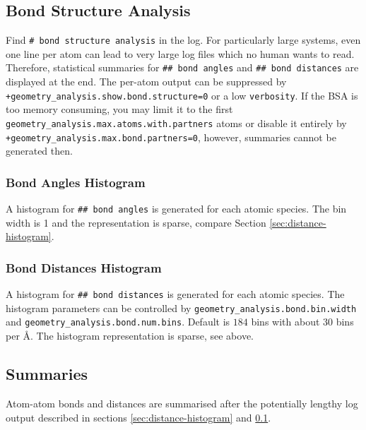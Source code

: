 \documentclass[oribibl]{llncs}
\newcommand{\ttt}[1]{\texttt{#1}}
\begin{document}
\subsection{Bond Structure Analysis} \label{sec:bond-structure-analysis}
%
Find \ttt{\# bond structure analysis} in the log.
For particularly large systems, even one line per atom
can lead to very large log files which no human wants to read.
Therefore, statistical summaries 
for \ttt{\#\# bond angles} 
and \ttt{\#\# bond distances} are displayed at the end.
The per-atom output can be suppressed
by \ttt{+geometry\_analysis.show.bond.structure=0} or a low \ttt{verbosity}.
If the BSA is too memory consuming, you may limit it 
to the first \ttt{geometry\_analysis.max.atoms.with.partners} atoms 
or disable it entirely by \ttt{+geometry\_analysis.max.bond.partners=0},
however, summaries cannot be generated then.

\subsubsection{Bond Angles Histogram} \label{sec:bond-angle-histogram}
A histogram for \ttt{\#\# bond angles} is generated for each atomic species.
The bin width is 1\degree{} and the representation is sparse,
compare Section \ref{sec:distance-histogram}.

\subsubsection{Bond Distances Histogram} \label{sec:bond-distance-histogram}
A histogram for \ttt{\#\# bond distances} is generated for each atomic species.
The histogram parameters can be controlled by 
\ttt{geometry\_analysis.bond.bin.width} and 
\ttt{geometry\_analysis.bond.num.bins}. Default is $184$ bins with about $30$ bins per \AA{}.
The histogram representation is sparse, see above.

\subsection{Summaries}
%
Atom-atom bonds and distances are summarised after the potentially lengthy log output described in
sections \ref{sec:distance-histogram} and \ref{sec:bond-structure-analysis}.
\end{document}
